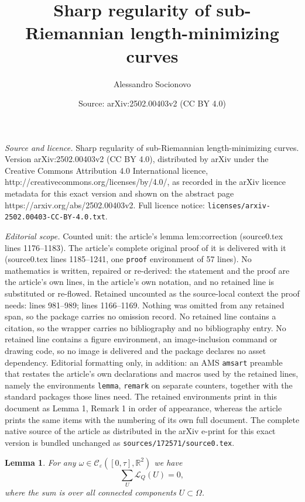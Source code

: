 \documentclass[10pt,a4paper]{amsart}
\title{Sharp regularity of sub-Riemannian length-minimizing curves}
\author{Alessandro Socionovo}
\date{Source: arXiv:2502.00403v2 (CC BY 4.0)}
\newtheorem{lemma}{Lemma}
\newcommand{\e}{\varepsilon}
\begin{document}
\maketitle

\noindent\emph{Source and licence.} Sharp regularity of sub-Riemannian length-minimizing curves. Version arXiv:2502.00403v2 (CC BY 4.0), distributed by arXiv under the Creative Commons Attribution 4.0 International licence, http://creativecommons.org/licenses/by/4.0/, as recorded in the arXiv licence metadata for this exact version and shown on the abstract page https://arxiv.org/abs/2502.00403v2. Full licence notice: \texttt{licenses/arxiv-2502.00403-CC-BY-4.0.txt}.\par\smallskip

\noindent\textit{Editorial scope.} Counted unit: the article's lemma lem:correction (source0.tex lines 1176--1183). The article's complete original proof of it is delivered with it (source0.tex lines 1185--1241, one \texttt{proof} environment of 57 lines). No mathematics is written, repaired or re-derived: the statement and the proof are the article's own lines, in the article's own notation, and no retained line is substituted or re-flowed.  Retained uncounted as the source-local context the proof needs: lines 981--989; lines 1166--1169.  Nothing was omitted from any retained span, so the package carries no omission record.  No retained line contains a citation, so the wrapper carries no bibliography and no bibliography entry.  No retained line contains a figure environment, an image-inclusion command or drawing code, so no image is delivered and the package declares no asset dependency.  Editorial formatting only, in addition: an AMS \texttt{amsart} preamble that restates the article's own declarations and macros used by the retained lines, namely the environments \texttt{lemma}, \texttt{remark} on separate counters, together with the standard packages those lines need.  The retained environments print in this document as Lemma 1, Remark 1 in order of appearance, whereas the article prints the same items with the numbering of its own full document.  The complete native source of the article as distributed in the arXiv e-print for this exact version is bundled unchanged as \texttt{sources/172571/source0.tex}.
\begin{lemma}
	\label{lem:Stokes}
	For any $\omega \in \mathcal C_\e([0,\tau],\mathbb R^2)$ we have 
	\begin{equation}
		\label{eq:Stokes}
		\sum_{U} \mathscr L_Q(U)=0,
	\end{equation} 
	where the sum is over all connected components $U\subset\Omega$.
\end{lemma}
\end{document}
